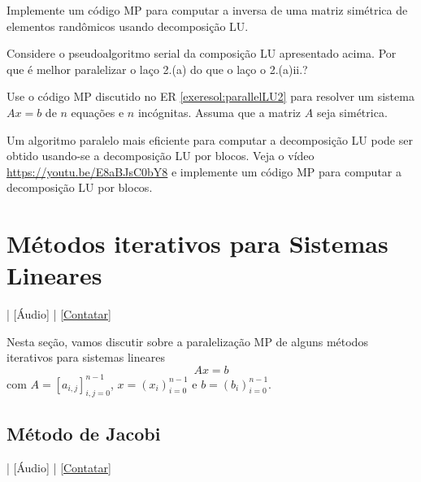 \begin{exer}
  Implemente um código MP para computar a inversa de uma matriz simétrica de elementos randômicos usando decomposição LU.
\end{exer}

\begin{exer}
  Considere o pseudoalgoritmo serial da composição LU apresentado acima. Por que é melhor paralelizar o laço 2.(a) do que o laço o 2.(a)ii.?
\end{exer}

\begin{exer}
  Use o código MP discutido no ER \ref{exeresol:parallelLU2} para resolver um sistema $Ax=b$ de $n$ equações e $n$ incógnitas. Assuma que a matriz $A$ seja simétrica.
\end{exer}

\begin{exer}
  Um algoritmo paralelo mais eficiente para computar a decomposição LU pode ser obtido usando-se a decomposição LU por blocos. Veja o vídeo \href{https://youtu.be/E8aBJsC0bY8}{https://youtu.be/E8aBJsC0bY8} e implemente um código MP para computar a decomposição LU por blocos.
\end{exer}

\section{Métodos iterativos para Sistemas Lineares}\label{cap_mp_sec_mitsislin}

\begin{flushright}
  [Vídeo] | [Áudio] | \href{https://phkonzen.github.io/notas/contato.html}{[Contatar]}
\end{flushright}

Nesta seção, vamos discutir sobre a paralelização MP de alguns métodos iterativos para sistemas lineares
\begin{equation}
  Ax = b
\end{equation}
com $A = [a_{i,j}]_{i,j=0}^{n-1}$, $x = (x_i)_{i=0}^{n-1}$ e $b=(b_i)_{i=0}^{n-1}$.

\subsection{Método de Jacobi}\label{subsec:mp_mitsislin_Jacobi}

\begin{flushright}
  [Vídeo] | [Áudio] | \href{https://phkonzen.github.io/notas/contato.html}{[Contatar]}
\end{flushright}

